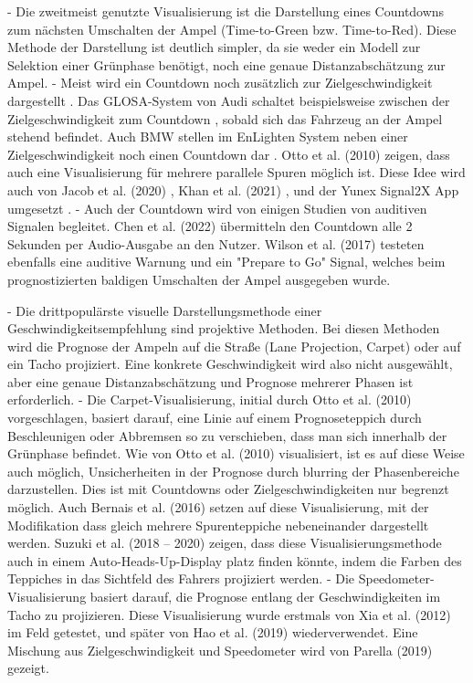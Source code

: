 - Die zweitmeist genutzte Visualisierung ist die Darstellung eines Countdowns zum nächsten Umschalten der Ampel (Time-to-Green bzw. Time-to-Red). Diese Methode der Darstellung ist deutlich simpler, da sie weder ein Modell zur Selektion einer Grünphase benötigt, noch eine genaue Distanzabschätzung zur Ampel.
- Meist wird ein Countdown noch zusätzlich zur Zielgeschwindigkeit dargestellt \cite{koukoumidis_signalguru_2011, koukoumidis_leveraging_2012}. Das GLOSA-System von Audi schaltet beispielsweise zwischen der Zielgeschwindigkeit zum Countdown \cite{zweck_traffic_2013}, sobald sich das Fahrzeug an der Ampel stehend befindet. Auch BMW stellen im EnLighten System neben einer Zielgeschwindigkeit noch einen Countdown dar \cite{sokolov_effects_2018}. Otto et al. (2010) \cite{otto_operating_2010} zeigen, dass auch eine Visualisierung für mehrere parallele Spuren möglich ist. Diese Idee wird auch von Jacob et al. (2020) \cite{jacob_ivs-kom_2020}, Khan et al. (2021) \cite{khan_eco-drive_2021}, und der Yunex Signal2X App umgesetzt \cite{yunex_traffic_v2x-kommunikation_2023}. 
- Auch der Countdown wird von einigen Studien von auditiven Signalen begleitet. Chen et al. (2022) \cite{chen_developing_2022} übermitteln den Countdown alle 2 Sekunden per Audio-Ausgabe an den Nutzer. Wilson et al. (2017) \cite{wilson_driver_2017} testeten ebenfalls eine auditive Warnung und ein "Prepare to Go" Signal, welches beim prognostizierten baldigen Umschalten der Ampel ausgegeben wurde.

- Die drittpopulärste visuelle Darstellungsmethode einer Geschwindigkeitsempfehlung sind projektive Methoden. Bei diesen Methoden wird die Prognose der Ampeln auf die Straße (Lane Projection, Carpet) oder auf ein Tacho projiziert. Eine konkrete Geschwindigkeit wird also nicht ausgewählt, aber eine genaue Distanzabschätzung und Prognose mehrerer Phasen ist erforderlich.
- Die Carpet-Visualisierung, initial durch Otto et al. (2010) \cite{otto_operating_2010} vorgeschlagen, basiert darauf, eine Linie auf einem Prognoseteppich durch Beschleunigen oder Abbremsen so zu verschieben, dass man sich innerhalb der Grünphase befindet. Wie von Otto et al. (2010) \cite{otto_operating_2010} visualisiert, ist es auf diese Weise auch möglich, Unsicherheiten in der Prognose durch blurring der Phasenbereiche darzustellen. Dies ist mit Countdowns oder Zielgeschwindigkeiten nur begrenzt möglich. Auch Bernais et al. (2016) \cite{bernais_design_2016} setzen auf diese Visualisierung, mit der Modifikation dass gleich mehrere Spurenteppiche nebeneinander dargestellt werden. Suzuki et al. (2018 -- 2020) \cite{suzuki_new_2018, suzuki_safety_2020} zeigen, dass diese Visualisierungsmethode auch in einem Auto-Heads-Up-Display platz finden könnte, indem die Farben des Teppiches in das Sichtfeld des Fahrers projiziert werden.
- Die Speedometer-Visualisierung basiert darauf, die Prognose entlang der Geschwindigkeiten im Tacho zu projizieren. Diese Visualisierung wurde erstmals von Xia et al. (2012) \cite{xia_field_2012} im Feld getestet, und später von Hao et al. (2019) \cite{hao_eco-approach_2019} wiederverwendet. Eine Mischung aus Zielgeschwindigkeit und Speedometer wird von Parella (2019) \cite{marias_parella_design_2019} gezeigt.

